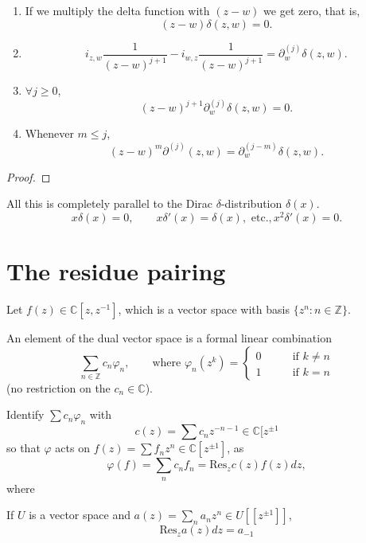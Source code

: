 \begin{lemma}
\label{lemma-elementary}
\begin{enumerate}
\item If we multiply the delta function with
$(z-w)$ we get zero, that is,
$$
(z-w)\delta(z,w)=0.
$$
\item
$$
i_{z,w}\frac{1}{(z-w)^{j+1}}-i_{w,z}\frac{1}
{(z-w)^{j+1}}
=\partial_w^{(j)}\delta(z,w).
$$
\item $\forall j\geq 0$,
$$
(z-w)^{j+1}\partial_w^{(j)}\delta(z,w)=0.
$$
\item Whenever $m \leq j$,
$$
(z-w)^m\partial^{(j)}(z,w)=\partial_w^{(j-m)}
\delta(z,w).
$$
\end{enumerate}
\end{lemma}

\begin{proof}

\end{proof}

\begin{remark}
\label{remark-like-usual-Dirac-delta}
All this is completely parallel
to the Dirac $\delta$-distribution
$\delta(x)$.
$$
x\delta(x)=0,\qquad
x\delta'(x)=\delta(x),\text{ etc.},
x^2\delta'(x)=0.
$$
\end{remark}

\section{The residue pairing}
\label{section-residue-pairing}

Let $f(z) \in \mathbb{C}[z,z^{-1}]$, which is
a vector space
with basis $\{z^n:n\in\mathbb{Z}\}$.

An element of the dual vector space is a
formal linear combination
$$
\sum_{n \in \mathbb{Z}}c_n\varphi_n,\qquad
\text{where }
\varphi_n(z^k)=\begin{cases}
0\qquad &\text{if }k \neq n \\
1\qquad &\text{if }k=n
\end{cases}
$$
(no restriction on the $c_n \in \mathbb{C}$).

Identify $\sum c_n \varphi_n$ with
$$
c(z)=\sum c_nz^{-n-1}\in \mathbb{C}[z^{\pm 1}
$$
so that $\varphi$ acts on $f(z)=\sum f_nz^n
\in \mathbb{C}[z^{\pm 1}]$,
as
$$
\varphi(f)=\sum_{n}c_nf_n=\text{Res}_zc(z)
f(z)dz,
$$
where
\begin{definition}
\label{definition-residue}
If  $U$ is a vector space and
$a(z)=\sum_{n}a_nz^n \in U[\![z^{\pm 1}]\!]$,
$$
\text{Res}_za(z)dz=a_{-1}
$$
\end{definition}

